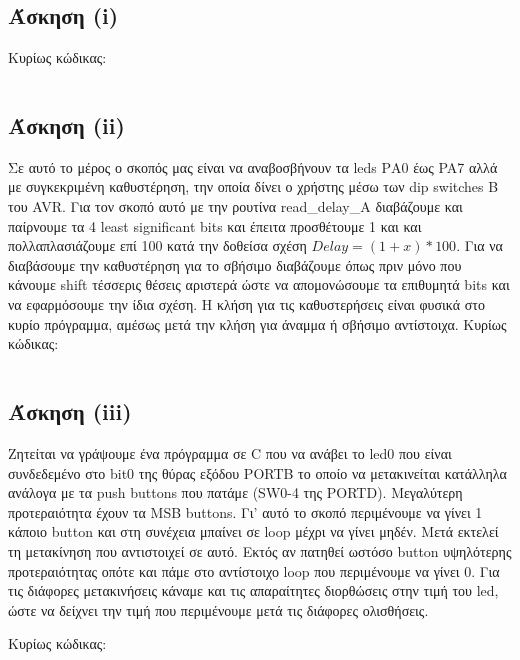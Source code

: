 \documentclass[a4paper,10pt]{article} \usepackage{anysize}
\begin{document}


\section*{} 
\subsection*{Άσκηση (i)}


\noindent Κυρίως κώδικας:
\inputminted[linenos,obeytabs,fontsize=\footnotesize]{c}{files/part1.S}
\subsection*{Άσκηση (ii)}

Σε αυτό το μέρος ο σκοπός μας είναι να αναβοσβήνουν τα leds ΡΑ0 έως PA7 αλλά
με συγκεκριμένη καθυστέρηση, την οποία δίνει ο χρήστης μέσω των dip switches B
του AVR. Για τον σκοπό αυτό με την ρουτίνα read\_delay\_A διαβάζουμε και
παίρνουμε τα 4 least significant bits και έπειτα προσθέτουμε 1 και και
πολλαπλασιάζουμε επί 100 κατά την δοθείσα σχέση $Delay = (1+x) * 100$. Για να
διαβάσουμε την καθυστέρηση για το σβήσιμο διαβάζουμε όπως πριν μόνο που
κάνουμε shift τέσσερις θέσεις αριστερά ώστε να απομονώσουμε τα επιθυμητά bits
και να εφαρμόσουμε την ίδια σχέση. Η κλήση για τις καθυστερήσεις είναι φυσικά
στο κυρίο πρόγραμμα, αμέσως μετά την κλήση για άναμμα ή σβήσιμο αντίστοιχα.
\noindent Κυρίως κώδικας:
\inputminted[linenos,obeytabs,fontsize=\footnotesize]{c}{files/part2.S}
\subsection*{Άσκηση (iii)}

Ζητείται να γράψουμε ένα πρόγραμμα σε C που να ανάβει το led0 που είναι
συνδεδεμένο στο bit0 της θύρας εξόδου PORTB το οποίο να μετακινείται κατάλληλα
ανάλογα με τα push buttons που πατάμε (SW0-4 της PORTD). Μεγαλύτερη
προτεραιότητα έχουν τα MSB buttons. Γι' αυτό το σκοπό περιμένουμε να γίνει 1
κάποιο button και στη συνέχεια μπαίνει σε loop μέχρι να γίνει μηδέν. Μετά
εκτελεί τη μετακίνηση που αντιστοιχεί σε αυτό. Εκτός αν πατηθεί ωστόσο button
υψηλότερης προτεραιότητας οπότε και πάμε στο αντίστοιχο loop που περιμένουμε
να γίνει 0. Για τις διάφορες μετακινήσεις κάναμε και τις απαραίτητες
διορθώσεις στην τιμή του led, ώστε να δείχνει την τιμή που περιμένουμε μετά
τις διάφορες ολισθήσεις.

\noindent Κυρίως κώδικας:
\inputminted[linenos,obeytabs,fontsize=\footnotesize]{c}{files/part3.c}
\end{document}
